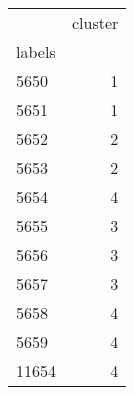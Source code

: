 \begin{tabular}{lr}
\toprule
{} &  cluster \\
labels &          \\
\midrule
5650   &        1 \\
5651   &        1 \\
5652   &        2 \\
5653   &        2 \\
5654   &        4 \\
5655   &        3 \\
5656   &        3 \\
5657   &        3 \\
5658   &        4 \\
5659   &        4 \\
11654  &        4 \\
\bottomrule
\end{tabular}
